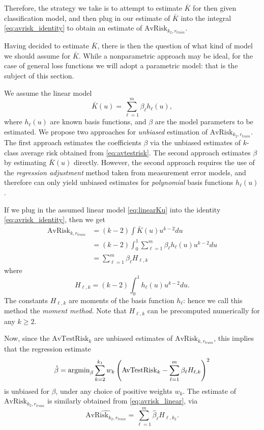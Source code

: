 \documentclass[12pt]{article}
\begin{document}
Therefore, the strategy we take is to attempt to estimate $\bar{K}$
for then given classification model, and then plug in our estimate of
$\bar{K}$ into the integral \eqref{eq:avrisk_identity} to obtain an
estimate of $\text{AvRisk}_{k_2, r_{train}}$.

Having decided to estimate $\bar{K}$, there is then the question of
what kind of model we should assume for $\bar{K}$.  While a
nonparametric approach may be ideal, for the case of general loss
functions we will adopt a parametric model: that is the subject of
this section.

We assume the linear model
\begin{equation}\label{eq:linearKu}
\bar{K}(u) = \sum_{\ell = 1}^m \beta_\ell h_\ell(u),
\end{equation}
where $h_\ell(u)$ are known basis functions, and $\beta$ are the model
parameters to be estimated. We propose two approaches
for \emph{unbiased} estimation of $\text{AvRisk}_{k_2, r_{train}}$.
The first approach estimates the coefficients $\beta$ via the unbiased
estimates of $k$-class average risk obtained
from \eqref{eq:avtestrisk}.  The second approach estimates $\beta$ by
estimating $\bar{K}(u)$ directly.  However, the second approach
requires the use of the \emph{regression adjustment} method taken from
measurement error models, and therefore can only yield unbiased
estimates for \emph{polynomial} basis functions $h_\ell(u)$.

If we plug in the assumed linear model \eqref{eq:linearKu} into the
identity \eqref{eq:avrisk_identity}, then we get
\begin{align}
\text{AvRisk}_{k, r_{train}} &= (k-2)\int \bar{K}(u) u^{k-2} du
\\&= (k-2)\int_0^1 \sum_{\ell = 1}^m \beta_\ell h_\ell(u) u^{k-2} du
\\&= \sum_{\ell = 1}^m \beta_\ell H_{\ell,k} \label{eq:avrisk_linear}
\end{align}
where
\begin{equation}
H_{\ell,k} = (k-2) \int_0^1 h_\ell(u) u^{k-2} du.
\end{equation}
The constants $H_{\ell, k}$ are moments of the basis function
$h_\ell$: hence we call this method the \emph{moment method.}  Note
that $H_{\ell, k}$ can be precomputed numerically for any $k \geq 2$.


Now, since the $\text{AvTestRisk}_k$ are unbiased estimates of
$\text{AvRisk}_{k, r_{train}}$, this implies that the regression
estimate
\[
\hat{\beta} = \text{argmin}_\beta \sum_{k=2}^{k_1} w_k \left(\text{AvTestRisk}_k - \sum_{\ell=1}^m \beta_\ell H_{\ell, k}\right)^2
\]
is unbiased for $\beta$, under any choice of positive weights $w_k$.
The estimate of $\text{AvRisk}_{k_2,r_{train}}$ is similarly obtained
from \eqref{eq:avrisk_linear}, via
\begin{equation}\label{eq:avrisk_hat}
\widehat{\text{AvRisk}_{k_2,r_{train}}} = \sum_{\ell=1}^m \hat{\beta}_\ell H_{\ell, k_2}.
\end{equation}
\end{document}
